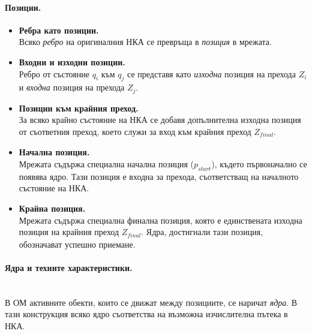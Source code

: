 \paragraph*{Позиции.}

\begin{itemize}
    \item \textbf{Ребра като позиции.}\\ Всяко \emph{ребро} на оригиналния НКА се превръща в \emph{позиция} в мрежата.

    \item \textbf{Входни и изходни позиции.}\\ Ребро от състояние \( q_i \) към \( q_j \) се представя като \emph{изходна} позиция на прехода \( Z_{i} \) и \emph{входна} позиция на прехода \( Z_{j} \).

    \item \textbf{Позиции към крайния преход.}\\ За всяко крайно състояние на НКА се добавя допълнителна изходна позиция от съответния преход, което служи за вход към крайния преход \( Z_{\mathit{final}} \).

    \item \textbf{Начална позиция.}\\ Мрежата съдържа специална начална позиция ($p_{start}$), където първоначално се появява ядро. Тази позиция е входна за прехода, съответстващ на началното състояние на НКА.

    \item \textbf{Крайна позиция.}\\ Мрежата съдържа специална финална позиция, която е единствената изходна позиция на крайния преход \( Z_{\mathit{final}} \). Ядра, достигнали тази позиция, обозначават успешно приемане.
\end{itemize}

\paragraph*{Ядра и техните характеристики.}
\mbox{}\\
В ОМ активните обекти, които се движат между позициите, се наричат \emph{ядра}. В тази конструкция всяко ядро съответства на възможна изчислителна пътека в НКА.

